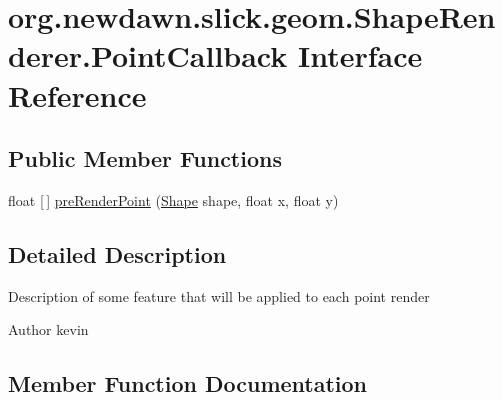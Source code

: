 \hypertarget{interfaceorg_1_1newdawn_1_1slick_1_1geom_1_1_shape_renderer_1_1_point_callback}{}\section{org.\+newdawn.\+slick.\+geom.\+Shape\+Renderer.\+Point\+Callback Interface Reference}
\label{interfaceorg_1_1newdawn_1_1slick_1_1geom_1_1_shape_renderer_1_1_point_callback}
\subsection*{Public Member Functions}
\begin{DoxyCompactItemize}
\item 
float \mbox{[}$\,$\mbox{]} \mbox{\hyperlink{interfaceorg_1_1newdawn_1_1slick_1_1geom_1_1_shape_renderer_1_1_point_callback_aeaa347bb2402b9b6d60712ea779b08ae}{pre\+Render\+Point}} (\mbox{\hyperlink{classorg_1_1newdawn_1_1slick_1_1geom_1_1_shape}{Shape}} shape, float x, float y)
\end{DoxyCompactItemize}


\subsection{Detailed Description}
Description of some feature that will be applied to each point render

\begin{DoxyAuthor}{Author}
kevin 
\end{DoxyAuthor}


\subsection{Member Function Documentation}
\mbox{\label{interfaceorg_1_1newdawn_1_1slick_1_1geom_1_1_shape_renderer_1_1_point_callback_aeaa347bb2402b9b6d60712ea779b08ae}} 
